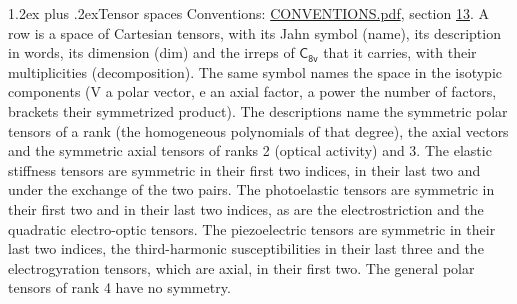 \documentclass[10pt,a4paper]{article}
\makeatletter
\renewcommand\section{\@startsection{section}{1}{\z@}{-3ex plus -1ex minus -.2ex}%
  {1.2ex plus .2ex}{\normalfont\large\sffamily\bfseries\color{parttitle}}}
\numberwithin{equation}{section}
\newcommand{\grp}[1]{\mathsf{#1}}
\makeatother
\begin{document}
\section{Tensor spaces}\label{s:tensor_spaces}
Conventions: \href{../../CONVENTIONS.pdf}{CONVENTIONS.pdf}, section \href{../../CONVENTIONS.pdf\#conv.13}{13}.
\leavevmode\label{n:head.name}\label{n:head.description}\label{n:head.dim}\label{n:head.decomposition}A row is a space of Cartesian tensors, with its Jahn symbol (name), its description in words, its dimension (dim) and the irreps of $\grp{C_{8v}}$ that it carries, with their multiplicities (decomposition). \label{n:label.jahn}The same symbol names the space in the isotypic components (V a polar vector, e an axial factor, a power the number of factors, brackets their symmetrized product). The descriptions name the symmetric polar tensors of a rank (the homogeneous polynomials of that degree), the axial vectors and the symmetric axial tensors of ranks 2 (optical activity) and 3. The elastic stiffness tensors are symmetric in their first two indices, in their last two and under the exchange of the two pairs. The photoelastic tensors are symmetric in their first two and in their last two indices, as are the electrostriction and the quadratic electro-optic tensors. The piezoelectric tensors are symmetric in their last two indices, the third-harmonic susceptibilities in their last three and the electrogyration tensors, which are axial, in their first two. The general polar tensors of rank 4 have no symmetry.
\end{document}
